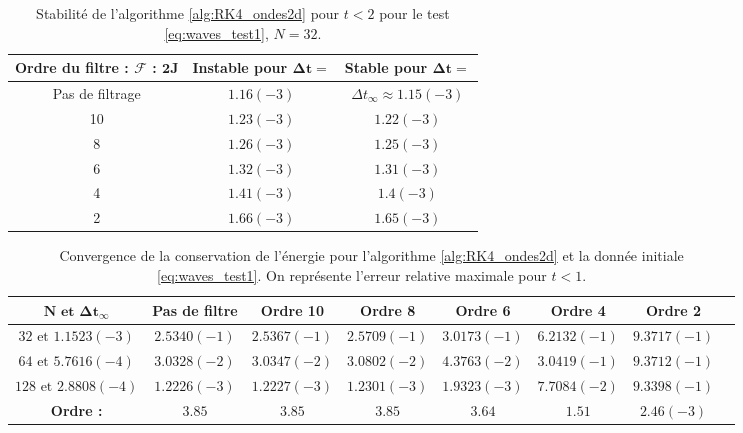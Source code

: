\begin{table}[htbp]
\begin{center}
\begin{tabular}{|c||c|c|}
\hline
\textbf{Ordre du filtre : } $\mathbf{\mathcal{F}}$ : $\mathbf{2J}$  & \textbf{Instable pour} $\mathbf{\Delta t =}$ & \textbf{Stable pour} $\mathbf{\Delta t =}$ \\
\hline
\hline
Pas de filtrage & $1.16(-3)$ & $\Delta t_{\infty} \approx 1.15(-3)$\\
10 & $1.23(-3)$ & $1.22(-3)$ \\
8 & $1.26(-3)$ & $1.25(-3)$ \\
6 & $1.32(-3)$ & $1.31(-3)$ \\
4 & $1.41(-3)$ & $1.4(-3)$ \\
2 & $1.66(-3)$ & $1.65(-3)$ \\
\hline
\end{tabular}
\end{center}
\caption{Stabilité de l'algorithme \ref{alg:RK4_ondes2d} pour $t<2$ pour le test \eqref{eq:waves_test1}, $N=32$.}
\label{tab:dt_critique_waves}
\end{table} 


\begin{table}[htbp]
\begin{center}
\begin{tabular}{|c||c|c|c|c|c|c|c|}
\hline
$\mathbf{N \text{ et } \Delta t _{\infty}}$ & \textbf{Pas de filtre} & \textbf{Ordre 10} & \textbf{Ordre 8} & \textbf{Ordre 6} & \textbf{Ordre 4} & \textbf{Ordre 2}\\
\hline
$32\text{ et }1.1523(-3)$ & $2.5340(-1)$ & $2.5367(-1)$ & $2.5709(-1)$ & $3.0173(-1)$ & $6.2132(-1)$ & $9.3717(-1)$ \\
\hline
$64\text{ et }5.7616(-4)$ & $3.0328(-2)$ & $3.0347(-2)$ & $3.0802(-2)$ & $4.3763(-2)$ & $3.0419(-1)$ & $9.3712(-1)$ \\
\hline
$128\text{ et }2.8808(-4)$& $1.2226(-3)$ & $1.2227(-3)$ & $1.2301(-3)$ & $1.9323(-3)$ & $7.7084(-2)$ & $9.3398(-1)$ \\
\hline
\hline
\textbf{Ordre :} & $3.85$ & $3.85$ & $3.85$ & $3.64$ & $1.51$ & $2.46(-3)$ \\
\hline 
\end{tabular}
\end{center}
\caption{Convergence de la conservation de l'énergie pour l'algorithme \ref{alg:RK4_ondes2d} et la donnée initiale \eqref{eq:waves_test1}. On représente l'erreur relative maximale pour $t<1$.}
\label{tab:conservation_waves}
\end{table} 






























